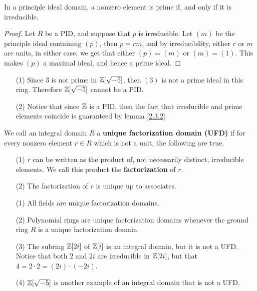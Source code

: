 \begin{lemma}\label{2.3.2}
    In a principle ideal domain, a nonzero element is prime if, and only if it
    is irreducible.
\end{lemma}
\begin{proof}
    Let $R$ be a PID, and suppose that $p$ is irreducible. Let $(m)$ be the
    principle ideal containing $(p)$, then $p=rm$, and by irreducibility, either
     $r$ or $m$ are units, in either case, we get that either $(p)=(m)$ or
     $(m)=(1)$. This makes $(p)$ a maximal ideal, and hence a prime ideal.
\end{proof}

\begin{example}\label{2.7}
    \begin{enumerate}
        \item[(1)] Since $3$ is not prime in  $\mathbb{Z}[\sqrt{-5}]$, then $(3)$ is not
            a prime ideal in this ring. Therefore $\mathbb{Z}[\sqrt{-5}]$ cannot be a
            PID.

        \item[(2)] Notice that since $\mathbb{Z}$ is a PID, then the fact that
            irreducible and prime elements coincide is guaranteed by lemma
            \ref{2.3.2}.
    \end{enumerate}
\end{example}

\begin{definition}
    We call an integral domain $R$ a  \textbf{unique factorization domain (UFD)}
    if for every nonzero element $r \in R$ which is not a unit, the following
    are true.
    \begin{enumerate}
        \item[(1)] $r$ can be written as the product of, not necessarily distinct,
            irreducible elements. We call this product the
            \textbf{factorization} of $r$.

        \item[(2)] The factorization of $r$ is unique up to associates.
    \end{enumerate}
\end{definition}

\begin{example}\label{2.8}
    \begin{enumerate}
        \item[(1)] All fields are unique factorization domains.

        \item[(2)] Polynomial rings are unique factorization domains whenever
            the ground ring $R$ is a unique factorization domain.

        \item[(3)] The subring $\mathbb{Z}[2i]$ of $\mathbb{Z}[i]$ is an integral domain, but it
            is not a UFD. Notice that both $2$ and  $2i$ are irreducible in
            $\mathbb{Z}[2i]$, but that $4=2 \cdot 2=(2i) \cdot (-2i)$.

        \item[(4)] $\mathbb{Z}[\sqrt{-5}]$ is another example of an integral domain that
            is not a UFD.
    \end{enumerate}
\end{example}

